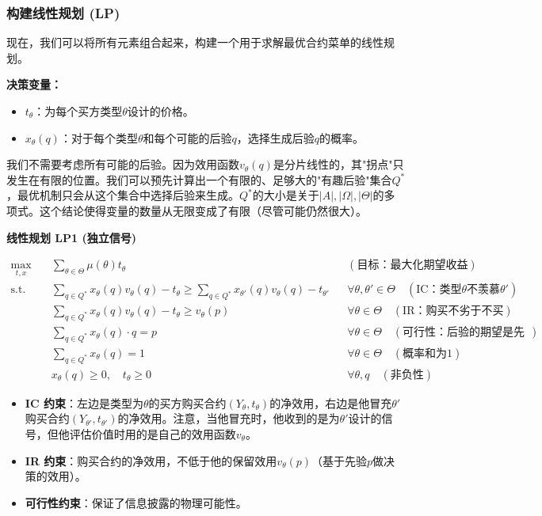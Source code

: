 \subsubsection{构建线性规划 (LP)}

现在，我们可以将所有元素组合起来，构建一个用于求解最优合约菜单的线性规划。

\textbf{决策变量：}
\begin{itemize}
    \item $t_\theta$：为每个买方类型$\theta$设计的价格。
    \item $x_\theta(q)$：对于每个类型$\theta$和每个可能的后验$q$，选择生成后验$q$的概率。
\end{itemize}

我们不需要考虑所有可能的后验。因为效用函数$v_\theta(q)$是分片线性的，其"拐点"只发生在有限的位置。我们可以预先计算出一个有限的、足够大的"有趣后验"集合$Q^*$，最优机制只会从这个集合中选择后验来生成。$Q^*$的大小是关于$|A|,|\Omega|,|\Theta|$的多项式。这个结论使得变量的数量从无限变成了有限（尽管可能仍然很大）。

\textbf{线性规划 LP1 (独立信号)}

\begin{align*}
    \max_{t,x} \quad & \sum_{\theta \in \Theta} \mu(\theta) t_{\theta} && (\text{目标：最大化期望收益}) \\
    \text{s.t.} \quad & \sum_{q \in Q^*} x_{\theta}(q) v_{\theta}(q) - t_{\theta} \geq \sum_{q \in Q^*} x_{\theta'}(q) v_{\theta}(q) - t_{\theta'} && \forall \theta, \theta' \in \Theta \quad (\text{IC：类型}\theta\text{不羡慕}\theta') \\
    & \sum_{q \in Q^*} x_{\theta}(q) v_{\theta}(q) - t_{\theta} \geq v_{\theta}(p) && \forall \theta \in \Theta \quad (\text{IR：购买不劣于不买}) \\
    & \sum_{q \in Q^*} x_{\theta}(q) \cdot q = p && \forall \theta \in \Theta \quad (\text{可行性：后验的期望是先验}) \\
    & \sum_{q \in Q^*} x_{\theta}(q) = 1 && \forall \theta \in \Theta \quad (\text{概率和为1}) \\
    & x_{\theta}(q) \geq 0, \quad t_{\theta} \geq 0 && \forall \theta, q \quad (\text{非负性})
\end{align*}

\begin{itemize}
    \item \textbf{IC 约束}：左边是类型为$\theta$的买方购买合约$(Y_\theta,t_\theta)$的净效用，右边是他冒充$\theta'$购买合约$(Y_{\theta'},t_{\theta'})$的净效用。注意，当他冒充时，他收到的是为$\theta'$设计的信号，但他评估价值时用的是自己的效用函数$v_\theta$。
    \item \textbf{IR 约束}：购买合约的净效用，不低于他的保留效用$v_\theta(p)$（基于先验$p$做决策的效用）。
    \item \textbf{可行性约束}：保证了信息披露的物理可能性。
\end{itemize}

